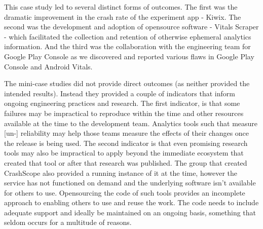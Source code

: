 
This case study led to several distinct forms of outcomes. The first was the dramatic improvement in the crash rate of the experiment app - Kiwix. The second was the development and adoption of opensource software - Vitals Scraper - which facilitated the collection and retention of otherwise ephemeral analytics information. And the third was the collaboration with the engineering team for Google Play Console as we discovered and reported various flaws in Google Play Console and Android Vitals. 

The mini-case studies did not provide direct outcomes (as neither provided the intended results). Instead they provided a couple of indicators that inform ongoing engineering practices and research. The first indicator, is that some failures may be impractical to reproduce within the time and other resources available at the time to the development team. Analytics tools such that measure [un-] reliability may help those teams measure the effects of their changes once the release is being used. The second indicator is that even promising research tools may also be impractical to apply beyond the immediate ecosystem that created that tool or after that research was published. The group that created CrashScope also provided a running instance of it at the time, however the service has not functioned on demand and the underlying software isn't available for others to use. Opensourcing the code of such tools provides an incomplete approach to enabling others to use and reuse the work. The code needs to include adequate support and ideally be maintained on an ongoing basis, something that seldom occurs for a multitude of reasons.

